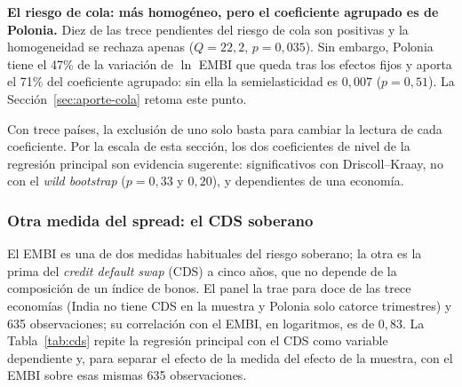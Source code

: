 \textbf{El riesgo de cola: más homogéneo, pero el coeficiente agrupado es de Polonia.} Diez de las trece pendientes del riesgo de cola son positivas y la homogeneidad se rechaza apenas ($Q=22{,}2$, $p=0{,}035$). Sin embargo, Polonia tiene el 47\% de la variación de $\ln$ EMBI que queda tras los efectos fijos y aporta el 71\% del coeficiente agrupado: sin ella la semielasticidad es $0{,}007$ ($p=0{,}51$). La Sección~\ref{sec:aporte-cola} retoma este punto.

Con trece países, la exclusión de uno solo basta para cambiar la lectura de cada coeficiente. Por la escala de esta sección, los dos coeficientes de nivel de la regresión principal son evidencia sugerente: significativos con Driscoll--Kraay, no con el \textit{wild bootstrap} ($p=0{,}33$ y $0{,}20$), y dependientes de una economía.

\subsubsection{Otra medida del spread: el CDS soberano}
\label{sec:cds}

El EMBI es una de dos medidas habituales del riesgo soberano; la otra es la prima del \textit{credit default swap} (CDS) a cinco años, que no depende de la composición de un índice de bonos. El panel la trae para doce de las trece economías (India no tiene CDS en la muestra y Polonia solo catorce trimestres) y 635 observaciones; su correlación con el EMBI, en logaritmos, es de $0{,}83$. La Tabla~\ref{tab:cds} repite la regresión principal con el CDS como variable dependiente y, para separar el efecto de la medida del efecto de la muestra, con el EMBI sobre esas mismas 635 observaciones.

